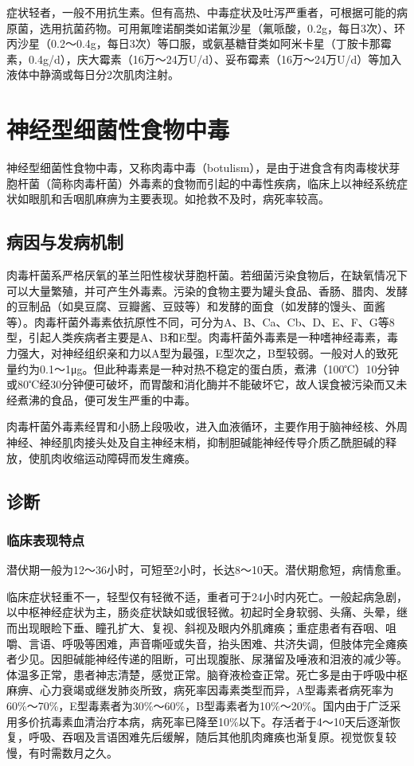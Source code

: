症状轻者，一般不用抗生素。但有高热、中毒症状及吐泻严重者，可根据可能的病原菌，选用抗菌药物。可用氟喹诺酮类如诺氟沙星（氟哌酸，0.2g，每日3次）、环丙沙星（0.2～0.4g，每日3次）等口服，或氨基糖苷类如阿米卡星（丁胺卡那霉素，0.4g/d），庆大霉素（16万～24万U/d）、妥布霉素（16万～24万U/d）等加入液体中静滴或每日分2次肌肉注射。

\protect\hypertarget{text00184.html}{}{}

\section{神经型细菌性食物中毒}

神经型细菌性食物中毒，又称肉毒中毒（botulism），是由于进食含有肉毒梭状芽胞杆菌（简称肉毒杆菌）外毒素的食物而引起的中毒性疾病，临床上以神经系统症状如眼肌和舌咽肌麻痹为主要表现。如抢救不及时，病死率较高。

\subsection{病因与发病机制}

肉毒杆菌系严格厌氧的革兰阳性梭状芽胞杆菌。若细菌污染食物后，在缺氧情况下可以大量繁殖，并可产生外毒素。污染的食物主要为罐头食品、香肠、腊肉、发酵的豆制品（如臭豆腐、豆瓣酱、豆豉等）和发酵的面食（如发酵的馒头、面酱等）。肉毒杆菌外毒素依抗原性不同，可分为A、B、Ca、Cb、D、E、F、G等8型，引起人类疾病者主要是A、B和E型。肉毒杆菌外毒素是一种嗜神经毒素，毒力强大，对神经组织亲和力以A型为最强，E型次之，B型较弱。一般对人的致死量约为0.1～1μg。但此种毒素是一种对热不稳定的蛋白质，煮沸（100℃）10分钟或80℃经30分钟便可破坏，而胃酸和消化酶并不能破坏它，故人误食被污染而又未经煮沸的食品，便可发生严重的中毒。

肉毒杆菌外毒素经胃和小肠上段吸收，进入血液循环，主要作用于脑神经核、外周神经、神经肌肉接头处及自主神经末梢，抑制胆碱能神经传导介质乙酰胆碱的释放，使肌肉收缩运动障碍而发生瘫痪。

\subsection{诊断}

\subsubsection{临床表现特点}

潜伏期一般为12～36小时，可短至2小时，长达8～10天。潜伏期愈短，病情愈重。

临床症状轻重不一，轻型仅有轻微不适，重者可于24小时内死亡。一般起病急剧，以中枢神经症状为主，肠炎症状缺如或很轻微。初起时全身软弱、头痛、头晕，继而出现眼睑下垂、瞳孔扩大、复视、斜视及眼内外肌瘫痪；重症患者有吞咽、咀嚼、言语、呼吸等困难，声音嘶哑或失音，抬头困难、共济失调，但肢体完全瘫痪者少见。因胆碱能神经传递的阻断，可出现腹胀、尿潴留及唾液和泪液的减少等。体温多正常，患者神志清楚，感觉正常。脑脊液检查正常。死亡多是由于呼吸中枢麻痹、心力衰竭或继发肺炎所致，病死率因毒素类型而异，A型毒素者病死率为60\%～70\%，E型毒素者为30\%～60\%，B型毒素者为10\%～20\%。国内由于广泛采用多价抗毒素血清治疗本病，病死率已降至10\%以下。存活者于4～10天后逐渐恢复，呼吸、吞咽及言语困难先后缓解，随后其他肌肉瘫痪也渐复原。视觉恢复较慢，有时需数月之久。

